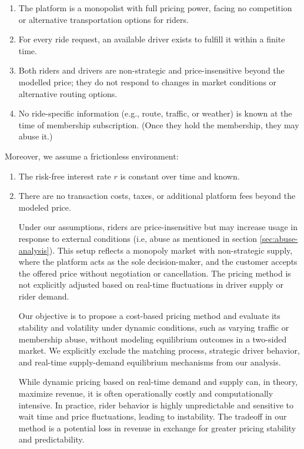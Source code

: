 \documentclass[12pt]{article}
\begin{document}
{{{{{\begin{enumerate}[label={(A$_{\arabic*}$)}, ref={(A$_{\arabic*}$)}]
	\item The platform is a monopolist with full pricing power, facing no competition or alternative transportation options for riders.
	
	\item For every ride request, an available driver exists to fulfill it within a finite time.
	
	\item Both riders and drivers are non-strategic and price-insensitive beyond the modelled price; they do not respond to changes in market conditions or alternative routing options.
	
	\item No ride-specific information (e.g., route, traffic, or weather) is known at the time of membership subscription. (Once  they hold the membership, they may abuse it.)
\end{enumerate}


Moreover, we assume a frictionless environment:
\begin{enumerate}[label={(B$_{\arabic*}$)}, ref={(B$_{\arabic*}$)}]  
	\item The risk-free interest rate $r$ is constant over time and known. \label{frictionless}
	
	
	\item  There are no transaction costs, taxes, or additional platform fees beyond the modeled price.
	
	
	Under our assumptions, riders are price-insensitive but may increase usage in response to external conditions (i.e, abuse  as mentioned in section \ref{sec:abuse-analysis}).  This setup reflects a monopoly market with non-strategic supply, where the platform acts as the sole decision-maker, and the customer accepts the offered price without negotiation or cancellation. The pricing method is not explicitly adjusted based on real-time fluctuations in driver supply or rider demand. 
	
Our objective is to propose a cost-based pricing method and evaluate its stability and volatility under dynamic conditions, such as varying traffic or membership abuse, without modeling equilibrium outcomes in a two-sided market. 	We explicitly exclude the matching process, strategic driver behavior, and real-time supply-demand equilibrium mechanisms from our analysis.

While dynamic pricing based on real-time demand and supply can, in theory, maximize revenue, it is often operationally costly and computationally intensive. In practice, rider behavior is highly unpredictable and sensitive to wait time and price fluctuations, leading to instability. The tradeoff in our method  is a potential loss in revenue in exchange for greater pricing stability and predictability.
\end{enumerate}

}}}}}
\end{document}
